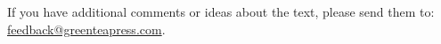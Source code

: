 If you have additional comments or ideas about the text, please send them to: \href{mailto:feedback@greenteapress.com}{feedback@greenteapress.com}.

